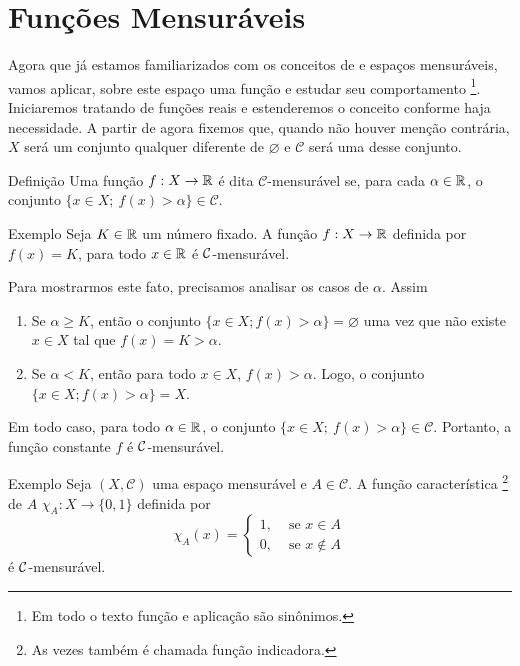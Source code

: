 \section{Funções Mensuráveis}
Agora que já estamos familiarizados com os conceitos de \sigal e espaços mensuráveis, vamos aplicar, sobre este espaço uma função e estudar seu comportamento
%
\footnote{Em todo o texto função e aplicação são sinônimos.}.
%
Iniciaremos tratando de funções reais e estenderemos o conceito conforme haja necessidade.
A partir de agora fixemos que, quando não houver menção contrária, $X$ será um conjunto qualquer diferente de $\varnothing$ e $\mathcal{C}$ será uma \sigal desse conjunto. 

\begin{env}{Definição}
	\label{def:mensurabilidade-funções-reais}
    Uma função $f: X \to \mathbb{R} $ é dita $\mathcal{C}$-mensurável se, para cada $\alpha \in \mathbb{R}$, o conjunto $\{x \in X;\ f(x) > \alpha\} \in \mathcal{C}$.
    \vspace{-0.2cm}
\end{env}
\begin{env}{Exemplo}
\label{ex:funcao-constante}
	Seja $K \in \mathbb{R}$ um número fixado. 
	A função $f: X \to \mathbb{R}$ definida por $f(x) = K$, para todo $x \in \mathbb{R}$  é $\operatorname{\mathcal{C}}$-mensurável.
	\vspace{-0.2cm}
\end{env}
Para mostrarmos este fato, precisamos analisar os casos de $\alpha$.
Assim
	\begin{enumerate}[label*= (\Roman*)]
		\item Se $\alpha \geq K$, então o conjunto $\{x \in X; f(x) > \alpha\} = \varnothing$ uma vez que não existe $x \in X$ tal que $f(x)= K > \alpha$.
		\item Se $\alpha < K$, então para todo $x \in X$, $f(x) > \alpha$.
		Logo, o conjunto $\{x \in X; f(x) > \alpha\} = X$.
	\end{enumerate}
Em todo caso, para todo $\alpha \in \mathbb{R}$, o conjunto  $\{x \in X;\ f(x) > \alpha\} \in \mathcal{C}$.
Portanto, a função constante $f$ é $\operatorname{\mathcal{C}}$-mensurável.
\begin{env}{Exemplo}
    Seja $(X, \mathcal{C})$ uma espaço mensurável e $A \in \mathcal{C}$.
    A função característica \footnote{As vezes também é chamada  função indicadora.} de $A$ 
    $\chi_A: X \to \{0,1\}$ definida por 
    $$\chi_A(x) =\left\{\begin{array}{cc}
         1, & \textrm{\ se \ } x \in A \\
         0, & \textrm{\ se \ } x \notin A
    \end{array}\right.
    $$
    é $\operatorname{\mathcal{C}}$-mensurável.
    \vspace{-0.2cm}
\end{env}

